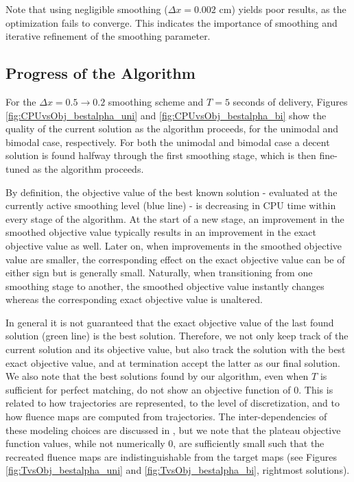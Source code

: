 \documentclass{iopart}
\begin{document}
Note that using negligible smoothing ($ \Delta x=0.002$ cm) yields poor results, as the optimization fails to converge. This indicates the importance of smoothing and iterative refinement of the smoothing parameter.

\subsection{Progress of the Algorithm}
For the $\Delta x = 0.5 \rightarrow 0.2$ smoothing scheme and $T=5$ seconds of delivery, Figures \ref{fig:CPUvsObj_bestalpha_uni} and \ref{fig:CPUvsObj_bestalpha_bi} show the quality of the current solution as the algorithm proceeds, for the unimodal and bimodal case, respectively. For both the unimodal and bimodal case a decent solution is found halfway through the first smoothing stage, which is then fine-tuned as the algorithm proceeds. 

By definition, the objective value of the best known solution - evaluated at the currently active smoothing level (blue line) - is decreasing in CPU time within every stage of the algorithm.
At the start of a new stage, an improvement in the smoothed objective value typically results in an improvement in the exact objective value as well.
Later on, when improvements in the smoothed objective value are smaller, the corresponding effect on the exact objective value can be of either sign but is generally small. 
Naturally, when transitioning from one smoothing stage to another, the smoothed objective value instantly changes whereas the corresponding exact objective value is unaltered.

In general it is not guaranteed that the exact objective value of the last found solution (green line) is the best solution.
Therefore, we not only keep track of the current solution and its objective value, but also track the solution with the best exact objective value, and at termination accept the latter as our final solution. We also note that the best solutions found by our algorithm, even when $T$ is sufficient for perfect matching, do not show an objective function of 0. This is related to how trajectories are represented, to the level of discretization, and to how fluence maps are computed from trajectories. The inter-dependencies of these modeling choices are discussed in \cite{thesisKvA}, but we note that the plateau objective function values, while not numerically 0, are sufficiently small such that the recreated fluence maps are indistinguishable from the target maps (see Figures \ref{fig:TvsObj_bestalpha_uni} and \ref{fig:TvsObj_bestalpha_bi}, rightmost solutions).
\end{document}
